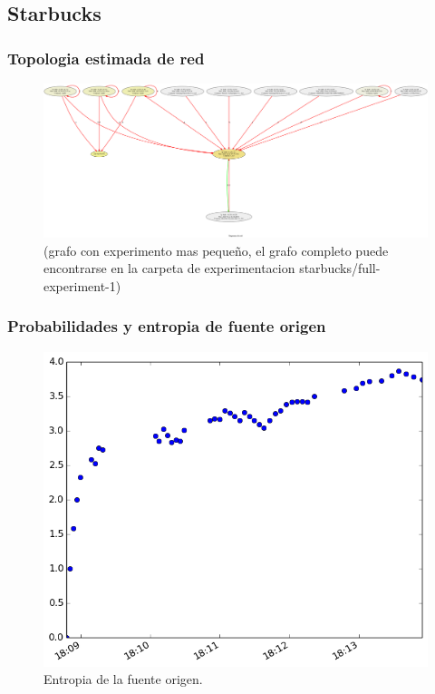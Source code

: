\subsection{Starbucks}
\subsubsection{Topologia estimada de red}
\begin{figure}[h!]
  \centering	
	\includegraphics[scale=0.15]{../experimentacion-svilerino/starbucks/graph-starbucks-3.png}
  \caption{(grafo con experimento mas pequeño, el grafo completo puede encontrarse en la carpeta de experimentacion starbucks/full-experiment-1)}
  \label{fig:grafo-starbucks}
\end{figure}

\subsubsection{Probabilidades y entropia de fuente origen}
\begin{figure}[h!]
  \centering
	\includegraphics[scale=0.66]{../experimentacion-svilerino/starbucks/full-experiment-1/entropy_src.png}
  \caption{Entropia de la fuente origen.}
  \label{fig:entropia-src-starbucks}
\end{figure}

